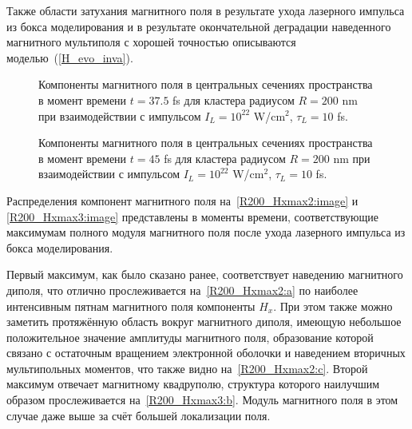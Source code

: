Также области затухания магнитного поля в результате ухода лазерного импульса из бокса моделирования и в результате окончательной деградации наведенного магнитного мультиполя с хорошей точностью описываются моделью~(\ref{H_evo_inva}).

    \begin{figure}[H]
        \hfil
        \caption{Компоненты магнитного поля в центральных сечениях пространства в момент времени $t = 37.5$ fs для кластера радиусом $R = 200$ nm при взаимодействии с импульсом $I_L = 10^{22}$ W/cm$^{2}$, $\tau_L = 10$ fs.}\label{R200_Hxmax2:image}
    \end{figure}

    \begin{figure}[H]
        \hfil
        \caption{Компоненты магнитного поля в центральных сечениях пространства в момент времени $t = 45$ fs для кластера радиусом $R = 200$ nm при взаимодействии с импульсом $I_L = 10^{22}$ W/cm$^{2}$, $\tau_L = 10$ fs.}\label{R200_Hxmax3:image}
    \end{figure}

Распределения компонент магнитного поля на~\autoref{R200_Hxmax2:image} и \autoref{R200_Hxmax3:image} представлены в моменты времени, соответствующие максимумам полного модуля магнитного поля после ухода лазерного импульса из бокса моделирования.

Первый максимум, как было сказано ранее, соответствует наведению магнитного диполя, что отлично прослеживается на~\autoref{R200_Hxmax2:a} по наиболее интенсивным пятнам магнитного поля компоненты $H_x$. При этом также можно заметить протяжённую область вокруг магнитного диполя, имеющую небольшое положительное значение амплитуды магнитного поля, образование которой связано с остаточным вращением электронной оболочки и наведением вторичных мультипольных моментов, что также видно на~\autoref{R200_Hxmax2:c}. Второй максимум отвечает магнитному квадруполю, структура которого наилучшим образом прослеживается на~\autoref{R200_Hxmax3:b}. Модуль магнитного поля в этом случае даже выше за счёт большей локализации поля.

